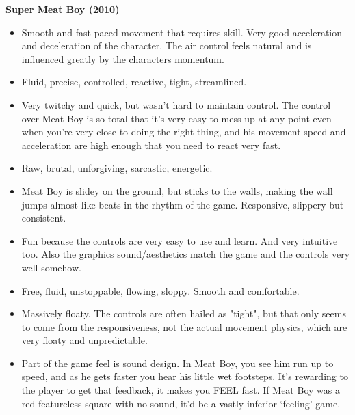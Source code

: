 \textbf{Super Meat Boy (2010)}
\vspace{-5mm}
\begin{itemize}[noitemsep,nolistsep]
\item Smooth and fast-paced movement that requires skill. Very good acceleration and deceleration of the character. The air control feels natural and is influenced greatly by the characters momentum. 
\item Fluid, precise, controlled, reactive, tight, streamlined.
\item Very twitchy and quick, but wasn't hard to maintain control. The control over Meat Boy is so total that it's very easy to mess up at any point even when you're very close to doing the right thing, and his movement speed and acceleration are high enough that you need to react very fast.
\item Raw, brutal, unforgiving, sarcastic, energetic.
\item Meat Boy is slidey on the ground, but sticks to the walls, making the wall jumps almost like beats in the rhythm of the game. Responsive, slippery but consistent.
\item Fun because the controls are very easy to use and learn. And very intuitive too. Also the graphics sound/aesthetics match the game and the controls very well somehow.
\item Free, fluid, unstoppable, flowing, sloppy. Smooth and comfortable.
\item Massively floaty. The controls are often hailed as "tight", but that only seems to come from the responsiveness, not the actual movement physics, which are very floaty and unpredictable.
\item Part of the game feel is sound design. In Meat Boy, you see him run up to speed, and as he gets faster you hear his little wet footsteps. It's rewarding to the player to get that feedback, it makes you FEEL fast. If Meat Boy was a red featureless square with no sound, it'd be a vastly inferior `feeling' game.
\end{itemize}

